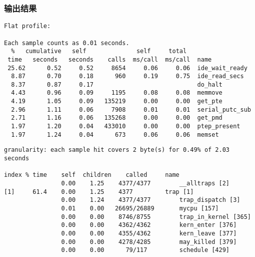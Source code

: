 \documentclass{beamer}
\begin{document}
\begin{frame}[fragile]
	\frametitle{输出结果}
	\tiny{
	\begin{Verbatim}[frame=single]
Flat profile:

Each sample counts as 0.01 seconds.
  %   cumulative   self              self     total           
 time   seconds   seconds    calls  ms/call  ms/call  name    
 25.62      0.52     0.52     8654     0.06     0.06  ide_wait_ready
  8.87      0.70     0.18      960     0.19     0.75  ide_read_secs
  8.37      0.87     0.17                             do_halt
  4.43      0.96     0.09     1195     0.08     0.08  memmove
  4.19      1.05     0.09   135219     0.00     0.00  get_pte
  2.96      1.11     0.06     7908     0.01     0.01  serial_putc_sub
  2.71      1.16     0.06   135268     0.00     0.00  get_pmd
  1.97      1.20     0.04   433010     0.00     0.00  ptep_present
  1.97      1.24     0.04      673     0.06     0.06  memset
	\end{Verbatim}
	}

	\tiny{
	\begin{Verbatim}[frame=single]
granularity: each sample hit covers 2 byte(s) for 0.49% of 2.03 seconds

index % time    self  children    called     name
                0.00    1.25    4377/4377        __alltraps [2]
[1]     61.4    0.00    1.25    4377         trap [1]
                0.00    1.24    4377/4377        trap_dispatch [3]
                0.01    0.00   26695/26889       mycpu [157]
                0.00    0.00    8746/8755        trap_in_kernel [365]
                0.00    0.00    4362/4362        kern_enter [376]
                0.00    0.00    4355/4362        kern_leave [377]
                0.00    0.00    4278/4285        may_killed [379]
                0.00    0.00      79/117         schedule [429]
	\end{Verbatim}
	}
\end{frame}
\end{document}
